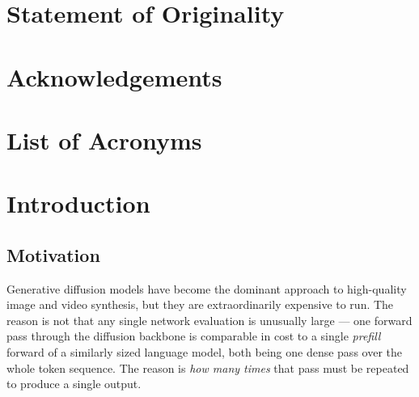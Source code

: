 \documentclass[11pt]{report}
\begin{document}
\chapter*{Statement of Originality}


\chapter*{Acknowledgements}


\tableofcontents

\listoffigures
{}

\chapter*{List of Acronyms}



\chapter{Introduction}
\label{ch:intro}

\section{Motivation}
\label{sec:motivation}

Generative diffusion models have become the dominant approach to
high-quality image and video synthesis, but they are extraordinarily
expensive to run. The reason is not that any single network evaluation is
unusually large --- one forward pass through the diffusion backbone is
comparable in cost to a single \emph{prefill} forward of a similarly sized
language model, both being one dense pass over the whole token sequence. The
reason is \emph{how many times} that pass must be repeated to produce a
single output.
\end{document}
